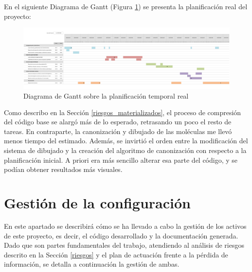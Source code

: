 \begin{landscape}

En el siguiente Diagrama de Gantt (Figura \ref{fig:gantt_real}) se presenta la planificación real del proyecto:

    \begin{figure}[h!]
        \centering
        \includegraphics[scale=0.9]{imagenes/planificacion/planificacion_real.png}
        \caption{Diagrama de Gantt sobre la planificación temporal real}
        \label{fig:gantt_real}
    \end{figure}
\end{landscape}

% 


Como describo en la Sección \ref{riesgos_materializados}, el proceso de compresión del código base se alargó más de lo esperado, retrasando un poco el resto de tareas. En contraparte, la canonización y dibujado de las moléculas me llevó menos tiempo del estimado. Además, se invirtió el orden entre la modificación del sistema de dibujado y la creación del algoritmo de canonización con respecto a la planificación inicial. A priori era más sencillo alterar esa parte del código, y se podían obtener resultados más visuales.

\section{Gestión de la configuración}
En este apartado se describirá cómo se ha llevado a cabo la gestión de los activos de este proyecto, es decir, el código desarrollado y la documentación generada. Dado que son partes fundamentales del trabajo, atendiendo al análisis de riesgos descrito en la Sección \ref{riesgos} y el plan de actuación frente a la pérdida de información, se detalla a continuación la gestión de ambas.

